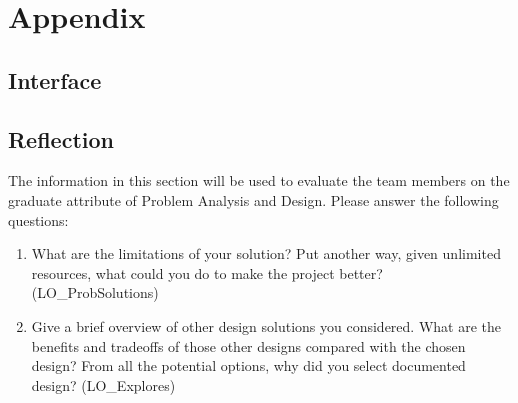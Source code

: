 \documentclass[12pt, titlepage]{article}
\begin{document}

% 

\newpage

\section{Appendix}

\subsection{Interface}


\subsection{Reflection}

The information in this section will be used to evaluate the team members on the graduate attribute
of Problem Analysis and Design. Please answer the following questions:

\begin{enumerate}
	\item What are the limitations of your solution? Put another way, given unlimited resources, what could
	      you do to make the project better? (LO\_ProbSolutions)
	\item Give a brief overview of other design solutions you considered. What are the benefits and tradeoffs
	      of those other designs compared with the chosen design? From all the potential options, why did you
	      select documented design? (LO\_Explores)
\end{enumerate}
\end{document}
